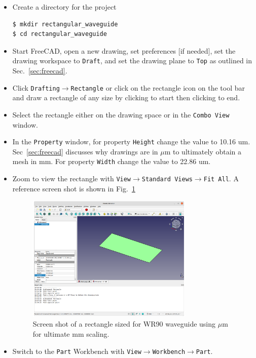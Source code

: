 \documentclass[titlepage]{article}
\renewcommand\_{\textunderscore\linebreak[1]}
\begin{document}
\begin{itemize}
\item Create a directory for the project
\begin{Verbatim}[fontsize=\small]
$ mkdir rectangular_waveguide
$ cd rectangular_waveguide
\end{Verbatim}
\item Start FreeCAD, open a new drawing, set preferences [if needed], set the drawing workspace to \texttt{Draft}, and set the drawing plane to \texttt{Top} as outlined in Sec.~\ref{sec:freecad}.
\item Click \texttt{Drafting}$\rightarrow$\texttt{Rectangle} or click on the rectangle icon on the tool bar and draw a rectangle of any size by clicking to start then clicking to end.
\item Select the rectangle either on the drawing space or in the \texttt{Combo View} window.
\item In the \texttt{Property} window, for property \texttt{Height} change the value to 10.16 um.  Sec~\ref{sec:freecad} discusses why drawings are in $\mu$m to ultimately obtain a mesh in mm.  For property \texttt{Width} change the value to 22.86 um.
\item Zoom to view the rectangle with \texttt{View}$\rightarrow$\texttt{Standard Views}$\rightarrow$\texttt{Fit All}.  A reference screen shot is shown in Fig.~\ref{fig:rectangle} 
\begin{figure}
  \centering
  \includegraphics[width=0.75\textwidth]{../tutorials/OpenParEM3D/rectangular_waveguide/screenshots/rectangle}
  \caption{Screen shot of a rectangle sized for WR90 waveguide using $\mu$m for ultimate mm scaling.}
  \label{fig:rectangle}
\end{figure}
\item Switch to the \texttt{Part} Workbench with \texttt{View}$\rightarrow$\texttt{Workbench}$\rightarrow$\texttt{Part}.

\end{itemize}
\end{document}
